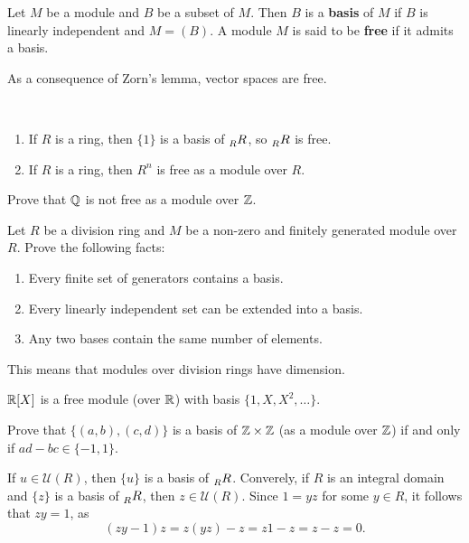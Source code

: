 \begin{definition}
    Let $M$ be a module and $B$ be a subset of $M$. Then $B$ is a \textbf{basis} of $M$ if
    $B$ is linearly independent and $M=(B)$. A module $M$ is said to be \textbf{free} if it admits a basis.   
\end{definition}

As a consequence of Zorn's lemma, 
vector spaces are free. 

\begin{examples}\
\begin{enumerate}
    \item If $R$ is a ring, then $\{1\}$ is a basis of $\prescript{}{R}{R}$, so $\prescript{}{R}{R}$ is free.
    \item If $R$ is a ring, then $R^n$ is free as a module over $R$. 
\end{enumerate}
\end{examples}

\begin{exercise}
    Prove that $\mathbb{Q}$ is not free as a module over $\mathbb{Z}$. 
\end{exercise}

\begin{exercise}
\label{xca:linear_algebra}
    Let $R$ be a division ring and $M$ be a non-zero and finitely generated module over $R$.
    Prove the following facts:
    \begin{enumerate}
        \item Every finite set of generators contains a basis.
        \item Every linearly independent set can be extended into a basis.
        \item Any two bases contain the same number of elements.
    \end{enumerate}
\end{exercise}

This means that modules over division rings have dimension.

\begin{example}
    $\mathbb{R}[X]$ is a free module (over $\mathbb{R}$) with basis $\{1,X,X^2,\dots\}$. 
\end{example}

\begin{exercise}
    Prove that $\{(a,b),(c,d)\}$ is a basis of $\mathbb{Z}\times\mathbb{Z}$ 
    (as a module over $\mathbb{Z}$) if and only if
    $ad-bc\in\{-1,1\}$. 
\end{exercise}

\begin{example}
If $u\in\mathcal{U}(R)$, then $\{u\}$ is a basis of $\prescript{}{R}R$. Converely, if $R$ is an integral domain and 
$\{z\}$ is a basis of $\prescript{}{R}R$, then $z\in\mathcal{U}(R)$. Since 
$1=yz$ for some $y\in R$, it follows that $zy=1$, as  
\[
(zy-1)z=z(yz)-z=z1-z=z-z=0.
\]	
\end{example}

